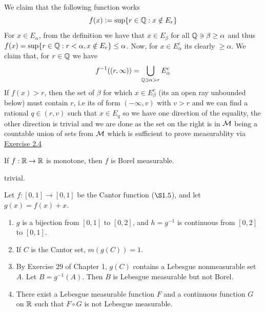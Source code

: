 \documentclass[12pt,a4paper]{article}
\begin{document}
\begin{solution}
    We claim that the following function works
    $$f(x) := \sup\{r\in\mathbb{Q}:x\notin E_r\}$$
    For $x\in E_\alpha$, from the definition we have that $x\in E_\beta$ for all $\mathbb{Q}\ni\beta\geq\alpha$ and thus $f(x)=\sup\{r\in\mathbb{Q}:r<\alpha, x\notin E_r\}\leq\alpha$. 
    Now, for $x\in E_\alpha^c$ its clearly $\geq\alpha$. 
    We claim that, for $r\in\mathbb{Q}$ we have 
    $$f^{-1}((r,\infty))=\bigcup_{\mathbb{Q}\ni\alpha> r}E_\alpha^c$$
    If $f(x)>r$, then the set of $\beta$ for which $x\in E^c_\beta$ (its an open ray unbounded below) must contain $r$, i.e its of form $(-\infty,v)$ with $v>r$ and we can find a rational $q\in(r,v)$ such that $x\in E_q$ so we have one direction of the equality, the other direction is trivial and we are done as the set on the right is in $\mathcal{M}$ being a countable union of sets from $\mathcal{M}$ which is sufficient to prove measurablity via \hyperref[prob:2-4]{Exercise 2.4}
\end{solution}
\begin{problem}\label{prob:2-8}
If $f: \mathbb{R} \to \mathbb{R}$ is monotone, then $f$ is Borel measurable.
\end{problem}
\begin{solution}
    trivial.
\end{solution}
\begin{problem}\label{prob:2-9}
Let $f: [0, 1] \to [0, 1]$ be the Cantor function ($\S 1.5$), and let $g(x) = f(x) + x$.
\begin{enumerate}[label=\alph*.]
    \item $g$ is a bijection from $[0, 1]$ to $[0, 2]$, and $h = g^{-1}$ is continuous from $[0, 2]$ to $[0, 1]$.
    \item If $C$ is the Cantor set, $m(g(C)) = 1$.
    \item By Exercise 29 of Chapter 1, $g(C)$ contains a Lebesgue nonmeasurable set $A$. Let $B = g^{-1}(A)$. Then $B$ is Lebesgue measurable but not Borel.
    \item There exist a Lebesgue measurable function $F$ and a continuous function $G$ on $\mathbb{R}$ such that $F \circ G$ is not Lebesgue measurable.
\end{enumerate}
\end{problem}
\end{document}
